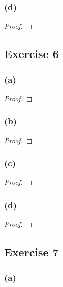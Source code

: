 \documentclass[14pt]{extarticle}
\begin{document}
\subsubsection{(d)}

\begin{proof}

\end{proof}

\subsection{Exercise 6}

\subsubsection{(a)}

\begin{proof}

\end{proof}

\subsubsection{(b)}

\begin{proof}

\end{proof}

\subsubsection{(c)}

\begin{proof}

\end{proof}

\subsubsection{(d)}

\begin{proof}

\end{proof}

\subsection{Exercise 7}

\subsubsection{(a)}
\end{document}
